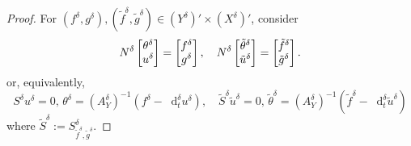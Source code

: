 \documentclass[10pt,a4paper]{amsart}
\newcommand{\NN}{N}
\newcommand*\diff{\mathop{}\!\mathrm{d}}
\begin{document}
\begin{proof} For $(f^\delta,g^\delta), (\tilde{f}^\delta,\tilde{g}^\delta) \in (Y^\delta)' \times (X^\delta)'$,  consider
$$
\NN^\delta \left[\begin{array}{@{}c@{}} \theta^\delta \\ u^\delta \end{array}\right]=\left[\begin{array}{@{}c@{}} f^\delta \\ g^\delta \end{array}\right], \quad
\NN^\delta \left[\begin{array}{@{}c@{}} \tilde{\theta}^\delta \\ \tilde{u}^\delta \end{array}\right]=\left[\begin{array}{@{}c@{}} \tilde{f}^\delta \\ \tilde{g}^\delta \end{array}\right].
$$
or, equivalently,
$$
S^\delta u^\delta=0,\, \theta^\delta=(A_Y^\delta)^{-1}(f^\delta-\diff_t^\delta u^\delta),\quad
\tilde{S}^\delta \tilde{u}^\delta=0,\, \tilde{\theta}^\delta=(A_Y^\delta)^{-1}(\tilde{f}^\delta-\diff_t^\delta \tilde{u}^\delta)
$$
where $\tilde{S}^\delta:=S_{\tilde{f}^\delta,\tilde{g}^\delta}^\delta$.


\end{proof}
\end{document}
